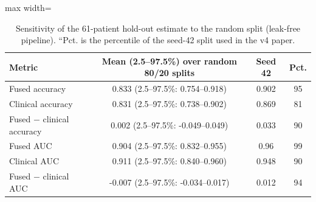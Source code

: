 \begin{table}[!t]
\centering
\scriptsize
\caption{Sensitivity of the 61-patient hold-out estimate to the random split (leak-free pipeline). ``Pct. is the percentile of the seed-42 split used in the v4 paper.}
\label{tab:holdout}
\setlength{\tabcolsep}{3pt}
\begin{adjustbox}{max width=\linewidth}
\begin{tabular}{lccc}
\toprule
Metric & Mean (2.5--97.5\%) over random 80/20 splits & Seed 42 & Pct. \\
\midrule
Fused accuracy & 0.833 (2.5--97.5\%: 0.754--0.918) & 0.902 & 95 \\
Clinical accuracy & 0.831 (2.5--97.5\%: 0.738--0.902) & 0.869 & 81 \\
Fused $-$ clinical accuracy & 0.002 (2.5--97.5\%: -0.049--0.049) & 0.033 & 90 \\
Fused AUC & 0.904 (2.5--97.5\%: 0.832--0.955) & 0.96 & 99 \\
Clinical AUC & 0.911 (2.5--97.5\%: 0.840--0.960) & 0.948 & 90 \\
Fused $-$ clinical AUC & -0.007 (2.5--97.5\%: -0.034--0.017) & 0.012 & 94 \\
\bottomrule
\end{tabular}
\end{adjustbox}
\end{table}
